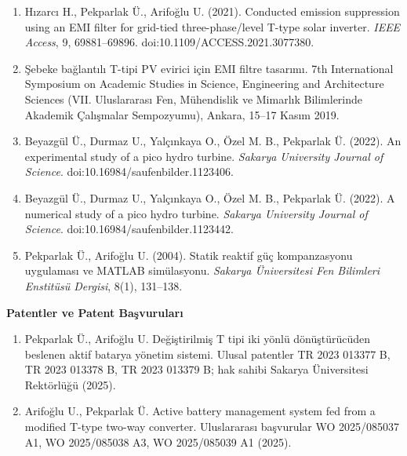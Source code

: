 \begin{enumerate}
  \item Hızarcı H., Pekparlak Ü., Arifoğlu U. (2021). Conducted emission suppression using an EMI filter for grid-tied three-phase/level T-type solar inverter. \emph{IEEE Access}, 9, 69881--69896. doi:10.1109/ACCESS.2021.3077380.
  \item Şebeke bağlantılı T-tipi PV evirici için EMI filtre tasarımı. 7th International Symposium on Academic Studies in Science, Engineering and Architecture Sciences (VII. Uluslararası Fen, Mühendislik ve Mimarlık Bilimlerinde Akademik Çalışmalar Sempozyumu), Ankara, 15--17 Kasım 2019.
  \item Beyazgül Ü., Durmaz U., Yalçınkaya O., Özel M. B., Pekparlak Ü. (2022). An experimental study of a pico hydro turbine. \emph{Sakarya University Journal of Science}. doi:10.16984/saufenbilder.1123406.
  \item Beyazgül Ü., Durmaz U., Yalçınkaya O., Özel M. B., Pekparlak Ü. (2022). A numerical study of a pico hydro turbine. \emph{Sakarya University Journal of Science}. doi:10.16984/saufenbilder.1123442.
  \item Pekparlak Ü., Arifoğlu U. (2004). Statik reaktif güç kompanzasyonu uygulaması ve MATLAB simülasyonu. \emph{Sakarya Üniversitesi Fen Bilimleri Enstitüsü Dergisi}, 8(1), 131--138.
\end{enumerate}

\textbf{Patentler ve Patent Başvuruları}

\begin{enumerate}
  \item Pekparlak Ü., Arifoğlu U. Değiştirilmiş T tipi iki yönlü dönüştürücüden beslenen aktif batarya yönetim sistemi. Ulusal patentler TR 2023 013377 B, TR 2023 013378 B, TR 2023 013379 B; hak sahibi Sakarya Üniversitesi Rektörlüğü (2025).
  \item Arifoğlu U., Pekparlak Ü. Active battery management system fed from a modified T-type two-way converter. Uluslararası başvurular WO 2025/085037 A1, WO 2025/085038 A3, WO 2025/085039 A1 (2025).
\end{enumerate}

\endgroup
